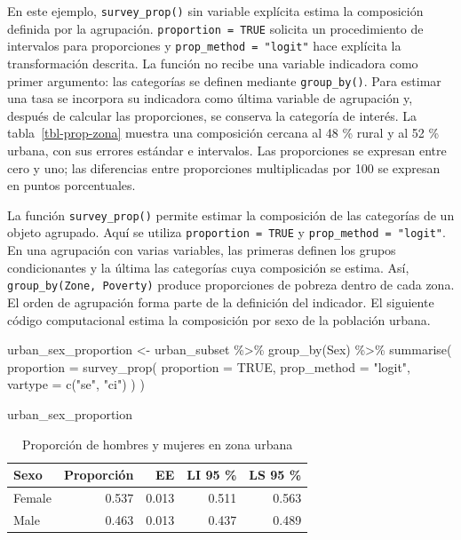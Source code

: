 \documentclass[
  spanish,
  11pt,
  letterpaper,
  oneside,
  open=any]{scrbook}
\newenvironment{Shaded}{\begin{snugshade}}{\end{snugshade}}
\newcommand{\AttributeTok}[1]{\textcolor[rgb]{0.40,0.45,0.13}{#1}}
\newcommand{\ConstantTok}[1]{\textcolor[rgb]{0.56,0.35,0.01}{#1}}
\newcommand{\FunctionTok}[1]{\textcolor[rgb]{0.28,0.35,0.67}{#1}}
\newcommand{\NormalTok}[1]{\textcolor[rgb]{0.00,0.23,0.31}{#1}}
\newcommand{\OtherTok}[1]{\textcolor[rgb]{0.00,0.23,0.31}{#1}}
\newcommand{\SpecialCharTok}[1]{\textcolor[rgb]{0.37,0.37,0.37}{#1}}
\newcommand{\StringTok}[1]{\textcolor[rgb]{0.13,0.47,0.30}{#1}}
\begin{document}
En este ejemplo, \texttt{survey\_prop()} sin variable explícita estima
la composición definida por la agrupación. \texttt{proportion\ =\ TRUE}
solicita un procedimiento de intervalos para proporciones y
\texttt{prop\_method\ =\ "logit"} hace explícita la transformación
descrita. La función no recibe una variable indicadora como primer
argumento: las categorías se definen mediante \texttt{group\_by()}. Para
estimar una tasa se incorpora su indicadora como última variable de
agrupación y, después de calcular las proporciones, se conserva la
categoría de interés. La tabla~\ref{tbl-prop-zona} muestra una
composición cercana al 48 \% rural y al 52 \% urbana, con sus errores
estándar e intervalos. Las proporciones se expresan entre cero y uno;
las diferencias entre proporciones multiplicadas por 100 se expresan en
puntos porcentuales.

La función \texttt{survey\_prop()} permite estimar la composición de las
categorías de un objeto agrupado. Aquí se utiliza
\texttt{proportion\ =\ TRUE} y \texttt{prop\_method\ =\ "logit"}. En una
agrupación con varias variables, las primeras definen los grupos
condicionantes y la última las categorías cuya composición se estima.
Así, \texttt{group\_by(Zone,\ Poverty)} produce proporciones de pobreza
dentro de cada zona. El orden de agrupación forma parte de la definición
del indicador. El siguiente código computacional estima la composición
por sexo de la población urbana.

\begin{Shaded}
\begin{Highlighting}[]
\NormalTok{urban\_sex\_proportion }\OtherTok{\textless{}{-}}\NormalTok{ urban\_subset }\SpecialCharTok{\%\textgreater{}\%}
  \FunctionTok{group\_by}\NormalTok{(Sex) }\SpecialCharTok{\%\textgreater{}\%}
  \FunctionTok{summarise}\NormalTok{(}
    \AttributeTok{proportion =} \FunctionTok{survey\_prop}\NormalTok{(}
      \AttributeTok{proportion =} \ConstantTok{TRUE}\NormalTok{,}
      \AttributeTok{prop\_method =} \StringTok{"logit"}\NormalTok{,}
      \AttributeTok{vartype =} \FunctionTok{c}\NormalTok{(}\StringTok{"se"}\NormalTok{, }\StringTok{"ci"}\NormalTok{)}
\NormalTok{    )}
\NormalTok{  )}

\NormalTok{urban\_sex\_proportion}
\end{Highlighting}
\end{Shaded}

{

\begin{longtable}[]{@{}lrrrr@{}}

\caption{\label{tbl-prop-sexo-urbano}Proporción de hombres y mujeres en
zona urbana}

\tabularnewline

\toprule\noalign{}
Sexo & Proporción & EE & LI 95 \% & LS 95 \% \\
\midrule\noalign{}
\endhead
\bottomrule\noalign{}
\endlastfoot
Female & 0.537 & 0.013 & 0.511 & 0.563 \\
Male & 0.463 & 0.013 & 0.437 & 0.489 \\

\end{longtable}

}
\end{document}
